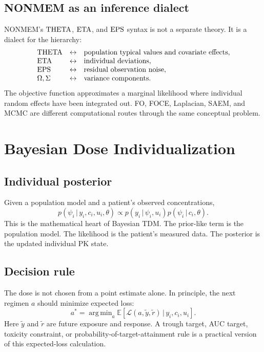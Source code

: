 \documentclass[a4paper]{article}
\DeclareMathOperator*{\argmin}{arg\,min}
\newcommand{\E}{\mathbb{E}}
\newcommand{\given}{\,|\,}
\newcommand{\loss}{\mathcal{L}}
\begin{document}
\subsection{NONMEM as an inference dialect}

NONMEM's \(\mathrm{THETA}\), \(\mathrm{ETA}\), and \(\mathrm{EPS}\) syntax is not a separate theory. It is a dialect for the hierarchy:
\[
  \begin{array}{lll}
  \mathrm{THETA} &\leftrightarrow& \text{population typical values and covariate effects},\\
  \mathrm{ETA} &\leftrightarrow& \text{individual deviations},\\
  \mathrm{EPS} &\leftrightarrow& \text{residual observation noise},\\
  \Omega,\Sigma &\leftrightarrow& \text{variance components}.
  \end{array}
\]
The objective function approximates a marginal likelihood where individual random effects have been integrated out. FO, FOCE, Laplacian, SAEM, and MCMC are different computational routes through the same conceptual problem.

\section{Bayesian Dose Individualization}

\subsection{Individual posterior}

Given a population model and a patient's observed concentrations,
\[
  p(\psi_i\given y_i,c_i,u_i,\theta)
  \propto
  p(y_i\given \psi_i,u_i)
  p(\psi_i\given c_i,\theta).
\]
This is the mathematical heart of Bayesian TDM. The prior-like term is the population model. The likelihood is the patient's measured data. The posterior is the updated individual PK state.

\subsection{Decision rule}

The dose is not chosen from a point estimate alone. In principle, the next regimen \(a\) should minimize expected loss:
\[
  a^*
  =
  \argmin_a
  \E\left[
    \loss(a,\tilde y,\tilde r)
    \given y_i,c_i,u_i
  \right].
\]
Here \(\tilde y\) and \(\tilde r\) are future exposure and response. A trough target, AUC target, toxicity constraint, or probability-of-target-attainment rule is a practical version of this expected-loss calculation.
\end{document}
